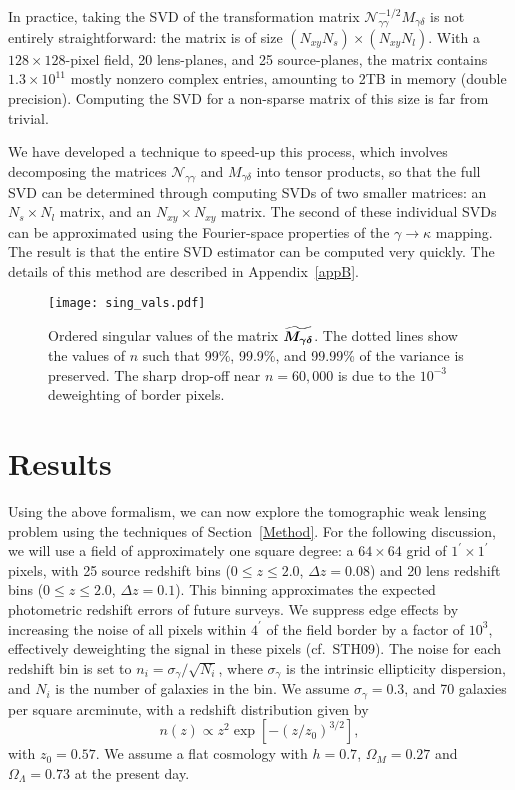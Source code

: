 In practice, taking the SVD of the transformation matrix 
$\mathcal{N}_{\gamma\gamma}^{-1/2}M_{\gamma\delta}$
is not entirely straightforward: the matrix is of size 
$(N_{xy}N_s) \times (N_{xy}N_l)$.
With a $128 \times 128$-pixel field, 20 lens-planes, and 25 source-planes,
the matrix contains $1.3\times 10^{11}$ mostly nonzero complex entries, 
amounting to 2TB in memory (double precision).  
Computing the SVD for a non-sparse matrix of this size is far from trivial.

We have developed a technique to speed-up this process, which involves decomposing
the matrices $\mathcal{N}_{\gamma\gamma}$ and $M_{\gamma\delta}$ into tensor
products, so that the full SVD can be determined through computing SVDs of
two smaller matrices: an $N_s\times N_l$ matrix, 
and an $N_{xy}\times N_{xy}$ matrix.
The second of these individual SVDs can be approximated using the
Fourier-space properties of the $\gamma\to\kappa$ mapping.  The result is
that the entire SVD estimator can be computed very quickly.  The details
of this method are described in Appendix~\ref{appB}.

\begin{figure*}[t] 
 \centering
 \texttt{[image: sing\_vals.pdf]}
 \caption{
   Ordered singular values of the matrix
   $\boldsymbol{\widetilde{M_{\gamma\delta}}}$.
   The dotted lines show the values of $n$ 
   such that 99\%, 99.9\%, and 99.99\% of the variance is preserved.
   The sharp drop-off near $n=60,000$ is due to the $10^{-3}$ 
   deweighting of border pixels.
   \label{fig_sing_vals}}
\end{figure*}

\section{Results}
\label{Results}
\label{Parameters}
Using the above formalism, we can now explore the
tomographic weak lensing problem using the 
techniques of Section~\ref{Method}.
For the following discussion, we will use a field of approximately 
one square degree: a $64 \times 64$ grid of
$1^\prime \times 1^\prime$ pixels, with 25 source redshift
bins ($0\le z\le 2.0$, $\Delta z = 0.08$) and 20 lens redshift bins
($0\le z\le 2.0$, $\Delta z = 0.1$).  This binning approximates the 
expected photometric redshift errors of future surveys.
We suppress edge effects by increasing
the noise of all pixels within $4^\prime$ of the field border
by a factor of $10^3$, effectively
deweighting the signal in these pixels (cf.\ STH09).  The noise
for each redshift bin is set to $n_i = \sigma_\gamma/\sqrt{N_i}$, where 
$\sigma_\gamma$ is the intrinsic ellipticity dispersion, and
$N_i$ is the number of galaxies in the bin.  We assume $\sigma_\gamma = 0.3$,
and 70 galaxies per square arcminute, with a redshift distribution given by
\begin{equation}
  \label{gal_z_dist}
  n(z) \propto z^2\exp{\left[-(z/z_0)^{3/2}\right]},
\end{equation}
with $z_0 = 0.57$.  We assume a flat cosmology with 
$h=0.7$, $\Omega_M = 0.27$  and $\Omega_\Lambda = 0.73$ at the present day.

